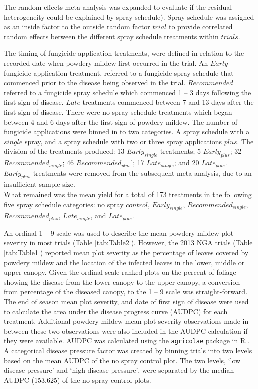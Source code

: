 \documentclass[agronomy,article,submit,moreauthors,pdftex]{mdpi}
\begin{document}
The random effects meta-analysis was expanded to evaluate if the residual heterogeneity could be explained by spray schedule).
Spray schedule was assigned as an inside factor to the outside random factor \(trial\) to provide correlated random effects between the different spray schedule treatments within \(trials\).

The timing of fungicide application treatments, were defined in relation to the recorded date when powdery mildew first occurred in the trial.
An \(Early\) fungicide application treatment, referred to a fungicide spray schedule that commenced prior to the disease being observed in the trial.
\(Recommended\) referred to a fungicide spray schedule which commenced 1 -- 3 days following the first sign of disease.
\(Late\) treatments commenced between 7 and 13 days after the first sign of disease.
There were no spray schedule treatments which began between 4 and 6 days after the first sign of powdery mildew.
The number of fungicide applications were binned in to two categories.
A spray schedule with a \(single\) spray, and a spray schedule with two or three spray applications \(plus\).
The division of the treatments produced: 13 \(Early_{single}\) treatments; 5 \(Early_{plus}\); 32 \(Recommended_{single}\); 46 \(Recommended_{plus}\)'; 17 \(Late_{single}\); and 20 \(Late_{plus}\).
\(Early_{plus}\) treatments were removed from the subsequent meta-analysis, due to an insufficient sample size.\\
What remained was the mean yield for a total of 173 treatments in the following five spray schedule categories: no spray \(control\), \(Early_{single}\), \(Recommended_{single}\), \(Recommended_{plus}\), \(Late_{single}\), and \(Late_{plus}\).

An ordinal 1 -- 9 scale was used to describe the mean powdery mildew plot severity in most trials (Table \ref{tab:Table2}).
However, the 2013 NGA trials (Table \ref{tab:Table1}) reported mean plot severity as the percentage of leaves covered by powdery mildew and the location of the infected leaves in the lower, middle or upper canopy.
Given the ordinal scale ranked plots on the percent of foliage showing the disease from the lower canopy to the upper canopy, a conversion from percentage of the diseased canopy, to the 1 -- 9 scale was straight-forward.
The end of season mean plot severity, and date of first sign of disease were used to calculate the area under the disease progress curve (AUDPC) for each treatment.
Additional powdery mildew mean plot severity observations made in-between these two observations were also included in the AUDPC calculation if they were available.
AUDPC was calculated using the \texttt{agricolae} package in R \citep{agricolae2020}.
A categorical disease pressure factor was created by binning trials into two levels based on the mean AUDPC of the no spray control plot.
The two levels, `low disease pressure' and `high disease pressure', were separated by the median AUDPC (153.625) of the no spray control plots.
\end{document}
